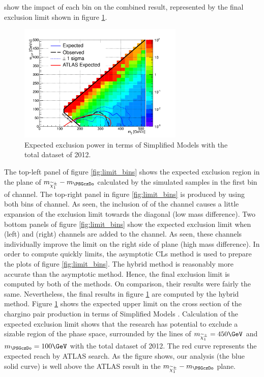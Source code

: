  show the impact of each bin on the combined result, represented by the final exclusion limit shown in figure \ref{fig:limit_final}. 
\begin{linenomath}
\begin{figure}[h]
\centering
\includegraphics[width=0.7\textwidth,keepaspectratio=true]{StatisticsFig/Exclusion4Bins.png}
\caption{Expected exclusion power in terms of Simplified Models
with the total dataset of 2012. 
}
\label{fig:limit_final}
\end{figure}
\end{linenomath}
The top-left panel of figure \ref{fig:limit_bins} shows the expected exclusion region in the plane of $m_{\chione}-m_{\PSGczDo}$
calculated by the simulated samples in the first bin of \tauTau channel. The top-right panel in figure \ref{fig:limit_bins} 
is produced by using both bins of \tauTau channel.
As seen, the inclusion of \bintwo of the \tauTau channel causes a little expansion of the exclusion limit towards 
the diagonal (low mass difference).
Two bottom panels of figure \ref{fig:limit_bins} show the expected exclusion limit when \eTau (left) and \muTau (right) channels are 
added to the \tauTau channel.  As seen, these channels individually improve the limit on the right side of plane (high mass difference).
In order to compute quickly limits, the asymptotic CLs method is used to prepare the plots of figure \ref{fig:limit_bins}.
The hybrid method is reasonably more accurate than the asymptotic method. Hence, the final exclusion limit is computed by both of the methods.
On comparison, their results were fairly the same. Nevertheless, the final results in figure \ref{fig:limit_final} are computed by the hybrid method.
Figure \ref{fig:limit_final} shows the expected upper limit on the cross section of the chargino pair production in terms of Simplified Models \cite{alves:sms}. 
Calculation of the expected exclusion limit shows that the research has potential to exclude 
a sizable region of the phase space, surrounded by the lines of $m_{\chione} = 450\GeV$ and $m_{\PSGczDo} = 100\GeV$ with 
the total dataset of 2012.
The red curve represents the expected reach by ATLAS %
search. As the figure shows, our analysis (the blue solid curve) is well above the ATLAS result in the $m_{\chione}-m_{\PSGczDo}$ plane.

